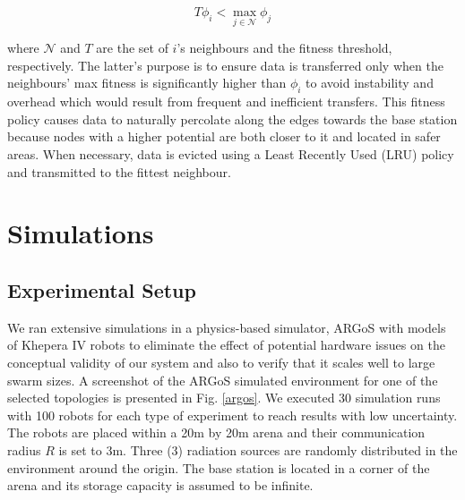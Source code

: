 \documentclass[runningheads]{llncs}
\begin{document}
\begin{equation}
    T\phi_i < \max_{j \in \mathcal{N}} \phi_j
\end{equation}

where $\mathcal{N}$ and $T$ are the set of $i$'s neighbours and the fitness threshold, 
respectively. The latter's purpose is to ensure data is transferred only when the 
neighbours' max fitness is significantly higher than $\phi_i$ to avoid instability and 
overhead which would result from frequent and inefficient transfers. This fitness policy  causes data to naturally percolate along the edges towards the base station because nodes 
with a higher potential are both closer to it and
located in safer areas. When necessary, data is evicted using a Least Recently Used (LRU) policy and transmitted to the fittest neighbour.


\section{Simulations}
\label{Simulations}

\subsection{Experimental Setup}
We ran extensive simulations in a physics-based simulator, ARGoS
\cite{Pinciroli:SI2012} with models of Khepera IV
\cite{kteam2021kheperaiv} robots to eliminate the effect of potential
hardware issues on the conceptual validity of our system and also to
verify that it scales well to large swarm sizes. A screenshot of the ARGoS simulated environment for one of the selected topologies is presented in Fig. \ref{argos}. We executed 30 simulation
runs with 100 robots for each type of experiment to reach results
with low uncertainty. The robots are placed within a 20m by 20m arena and their communication radius $R$ is set to 3m. Three (3) radiation sources are randomly distributed in the environment around the origin. The base station is located in a corner of the arena and its storage capacity is assumed to be infinite. 


\end{document}
